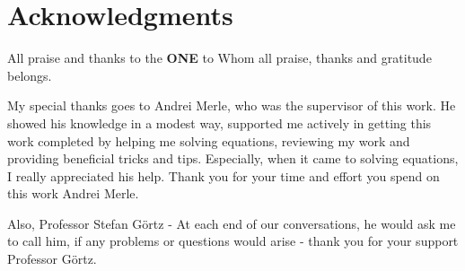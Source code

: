 
\chapter*{Acknowledgments}

All praise and thanks to the 
\textbf{ONE} to Whom all praise, 
thanks and gratitude belongs. 

\vspace{1cm}
My special thanks goes to Andrei Merle, who was 
the supervisor of this work. He showed  his 
knowledge in a modest way, supported 
me actively in getting this work completed by 
helping me solving equations, reviewing my 
work and providing beneficial tricks and tips. 
Especially, when it came to solving equations,
I really appreciated his help. 
Thank you for your time and 
effort you spend on this work Andrei Merle. \newline

Also, Professor Stefan Görtz - At
each end of our conversations, he would 
ask me to call him, if any problems or 
questions would arise - thank you for 
your support Professor Görtz.
